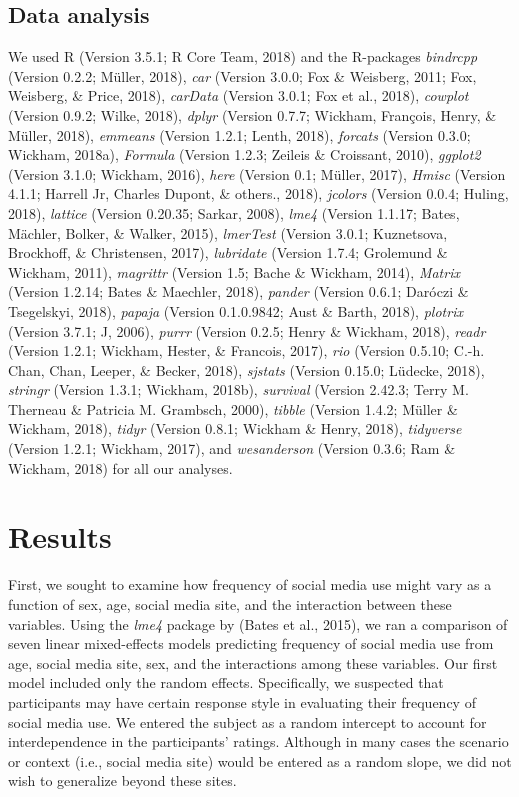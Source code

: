\documentclass[man]{apa6}
\theoremstyle{definition}
\theoremstyle{definition}
\theoremstyle{definition}
\theoremstyle{remark}
\begin{document}
\subsection{Data analysis}\label{data-analysis}

We used R (Version 3.5.1; R Core Team, 2018) and the R-packages
\emph{bindrcpp} (Version 0.2.2; Müller, 2018), \emph{car} (Version
3.0.0; Fox \& Weisberg, 2011; Fox, Weisberg, \& Price, 2018),
\emph{carData} (Version 3.0.1; Fox et al., 2018), \emph{cowplot}
(Version 0.9.2; Wilke, 2018), \emph{dplyr} (Version 0.7.7; Wickham,
François, Henry, \& Müller, 2018), \emph{emmeans} (Version 1.2.1; Lenth,
2018), \emph{forcats} (Version 0.3.0; Wickham, 2018a), \emph{Formula}
(Version 1.2.3; Zeileis \& Croissant, 2010), \emph{ggplot2} (Version
3.1.0; Wickham, 2016), \emph{here} (Version 0.1; Müller, 2017),
\emph{Hmisc} (Version 4.1.1; Harrell Jr, Charles Dupont, \& others.,
2018), \emph{jcolors} (Version 0.0.4; Huling, 2018), \emph{lattice}
(Version 0.20.35; Sarkar, 2008), \emph{lme4} (Version 1.1.17; Bates,
Mächler, Bolker, \& Walker, 2015), \emph{lmerTest} (Version 3.0.1;
Kuznetsova, Brockhoff, \& Christensen, 2017), \emph{lubridate} (Version
1.7.4; Grolemund \& Wickham, 2011), \emph{magrittr} (Version 1.5; Bache
\& Wickham, 2014), \emph{Matrix} (Version 1.2.14; Bates \& Maechler,
2018), \emph{pander} (Version 0.6.1; Daróczi \& Tsegelskyi, 2018),
\emph{papaja} (Version 0.1.0.9842; Aust \& Barth, 2018), \emph{plotrix}
(Version 3.7.1; J, 2006), \emph{purrr} (Version 0.2.5; Henry \& Wickham,
2018), \emph{readr} (Version 1.2.1; Wickham, Hester, \& Francois, 2017),
\emph{rio} (Version 0.5.10; C.-h. Chan, Chan, Leeper, \& Becker, 2018),
\emph{sjstats} (Version 0.15.0; Lüdecke, 2018), \emph{stringr} (Version
1.3.1; Wickham, 2018b), \emph{survival} (Version 2.42.3; Terry M.
Therneau \& Patricia M. Grambsch, 2000), \emph{tibble} (Version 1.4.2;
Müller \& Wickham, 2018), \emph{tidyr} (Version 0.8.1; Wickham \& Henry,
2018), \emph{tidyverse} (Version 1.2.1; Wickham, 2017), and
\emph{wesanderson} (Version 0.3.6; Ram \& Wickham, 2018) for all our
analyses.

\section{Results}\label{results}

First, we sought to examine how frequency of social media use might vary
as a function of sex, age, social media site, and the interaction
between these variables. Using the \emph{lme4} package by (Bates et al.,
2015), we ran a comparison of seven linear mixed-effects models
predicting frequency of social media use from age, social media site,
sex, and the interactions among these variables. Our first model
included only the random effects. Specifically, we suspected that
participants may have certain response style in evaluating their
frequency of social media use. We entered the subject as a random
intercept to account for interdependence in the participants' ratings.
Although in many cases the scenario or context (i.e., social media site)
would be entered as a random slope, we did not wish to generalize beyond
these sites.
\end{document}
